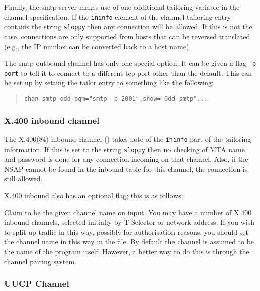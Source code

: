 Finally, the smtp server makes use of one additional tailoring
variable in the channel specification. If the \verb|ininfo| element
of the channel tailoring entry contains the string
{\verb|sloppy|} then any connection will be allowed. If
this is not the case, connections are only supported from hosts that
can be reversed translated (e.g., the IP number can be converted back
to a host name).

The smtp outbound channel has only one special option. It can be
given a flag \verb|-p port| to tell it to connect to a different tcp
port other than the default. This can be set up by setting the tailor
entry to something like the following:

\begin{quote}\small\begin{verbatim}
chan smtp-odd pgm="smtp -p 2001",show="Odd smtp"...
\end{verbatim}\end{quote}


\subsubsection	{X.400 inbound channel}

The X.400(84) inbound channel () takes note of the
\verb|ininfo| part of the tailoring information. If this is set to the
string \verb|sloppy| then no checking of MTA name and password is done
for any connection incoming on that channel. Also, if the NSAP cannot
be found in the inbound table for this channel, the connection is
still allowed.

X.400 inbound also has an optional flag; this is as follows:
\begin{describe}
\item[\verb|-c channelname|:]	Claim to be the given channel name on
input. You may have a number of X.400 inbound channels, selected
initially by T-Selector or network address. If you wish to split up
traffic in this way, possibly for authorisation reasons, you should
set the channel name in this way in the  file. By default
the channel is assumed to be the name of the program itself. However,
a better way to do this is through the channel pairing system.
\end{describe}

\subsubsection	{UUCP Channel}

